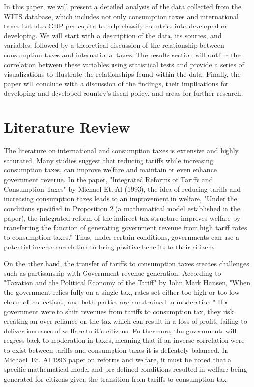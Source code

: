 \documentclass[12pt]{article}
\begin{document}
In this paper, we will present a detailed analysis of the data collected from the WITS database, which includes not only consumption taxes and international taxes but also GDP per capita to help classify countries into developed or developing. We will start with a description of the data, its sources, and variables, followed by a theoretical discussion of the relationship between consumption taxes and international taxes. The results section will outline the correlation between these variables using statistical tests and provide a series of visualizations to illustrate the relationships found within the data. Finally, the paper will conclude with a discussion of the findings, their implications for developing and developed country's fiscal policy, and areas for further research.

\section{Literature Review} \label{sec:literature}

The literature on international and consumption taxes is extensive and highly saturated. Many studies suggest that reducing tariffs while increasing consumption taxes, can improve welfare and maintain or even enhance government revenue. In the paper, "Integrated Reforms of Tariffs and Consumption Taxes" by Michael Et. Al (1993), the idea of reducing tariffs and increasing consumption taxes leads to an improvement in welfare, "Under the conditions specified in Proposition 2 (a mathematical model established in the paper), the integrated reform of the indirect tax structure improves welfare by transferring the function of generating government revenue from high tariff rates to consumption taxes.” Thus, under certain conditions, governments can use a potential inverse correlation to bring positive benefits to their citizens. 

On the other hand, the transfer of tariffs to consumption taxes creates challenges such as partisanship with Government revenue generation.  According to "Taxation and the Political Economy of the Tariff" by John Mark Hansen, "When the government relies fully on a single tax, rates set either too high or too low choke off collections, and both parties are constrained to moderation." If a government were to shift revenues from tariffs to consumption tax, they risk creating an over-reliance on the tax which can result in a loss of profit, failing to deliver increases of welfare to it's citizens. Furthermore, the governments will regress back to moderation in taxes, meaning that if an inverse correlation were to exist between tariffs and consumption taxes it is delicately balanced. In Michael. Et. Al 1993 paper on reforms and welfare, it must be noted that a specific mathematical model and pre-defined conditions resulted in welfare being generated for citizens given the transition from tariffs to consumption tax. 
\end{document}
